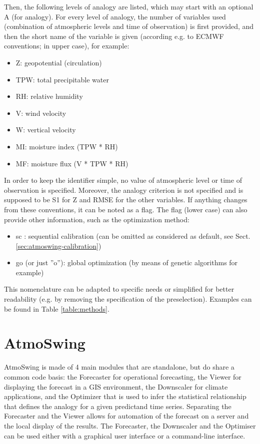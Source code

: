 \documentclass[review]{elsarticle}
\begin{document}
Then, the following levels of analogy are listed, which may start with an optional A (for analogy). For every level of analogy, the number of variables used (combination of atmospheric levels and time of observation) is first provided, and then the short name of the variable is given (according e.g. to ECMWF conventions; in upper case), for example:
\begin{itemize}
	\item Z: geopotential (circulation)
	\item TPW: total precipitable water
	\item RH: relative humidity
	\item V: wind velocity
	\item W: vertical velocity
	\item MI: moisture index (TPW * RH)
	\item MF: moisture flux (V * TPW * RH)
\end{itemize}

In order to keep the identifier simple, no value of atmospheric level or time of observation is specified. Moreover, the analogy criterion is not specified and is supposed to be S1 for Z and RMSE for the other variables. If anything changes from these conventions, it can be noted as a flag. The flag (lower case) can also provide other information, such as the optimization method:
\begin{itemize}
	\item sc : sequential calibration (can be omitted as considered as default, see Sect. \ref{sec:atmoswing-calibration})
	\item go (or just ''o''): global optimization (by means of genetic algorithms for example)
\end{itemize}

This nomenclature can be adapted to specific needs or simplified for better readability (e.g. by removing the specification of the preselection). Examples can be found in Table \ref{table:methods}.


\section{AtmoSwing}
\label{sec:atmoswing}

AtmoSwing is made of 4 main modules that are standalone, but do share a common code basis: the Forecaster for operational forecasting, the Viewer for displaying the forecast in a GIS environment, the Downscaler for climate applications, and the Optimizer that is used to infer the statistical relationship that defines the analogy for a given predictand time series. Separating the Forecaster and the Viewer allows for automation of the forecast on a server and the local display of the results. The Forecaster, the Downscaler and the Optimiser can be used either with a graphical user interface or a command-line interface.
\end{document}
